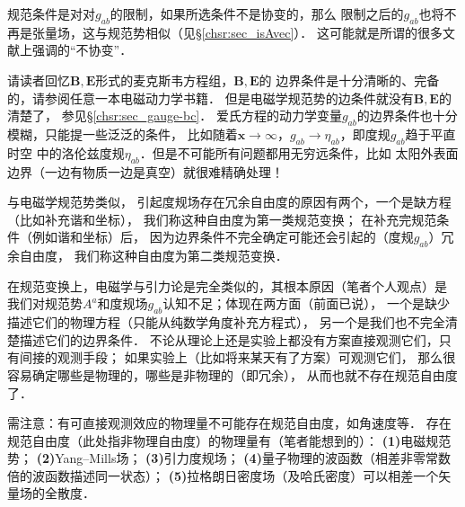 

规范条件是对对$g_{ab}$的限制，如果所选条件不是协变的，那么
限制之后的$g_{ab}$也将不再是张量场，这与规范势相似（见\S\ref{chsr:sec_isAvec}）．
这可能就是所谓的很多文献上强调的“不协变”．

请读者回忆$\boldsymbol{B},\boldsymbol{E}$形式的麦克斯韦方程组，$\boldsymbol{B},\boldsymbol{E}$的
边界条件是十分清晰的、完备的，请参阅任意一本电磁动力学书籍．
但是电磁学规范势的边条件就没有$\boldsymbol{B},\boldsymbol{E}$的清楚了，
参见\S\ref{chsr:sec_gauge-bc}．
爱氏方程的动力学变量$g_{ab}$的边界条件也十分模糊，只能提一些泛泛的条件，
比如随着$\boldsymbol{x}\to \infty$，$g_{ab}\to \eta_{ab}$，即度规$g_{ab}$趋于平直时空
中的洛伦兹度规$\eta_{ab}$．但是不可能所有问题都用无穷远条件，比如
太阳外表面边界（一边有物质一边是真空）就很难精确处理！

与电磁学规范势类似，
引起度规场存在冗余自由度的原因有两个，一个是缺方程（比如补充谐和坐标），
我们称这种自由度为{\heiti 第一类规范变换}；
在补充完规范条件（例如谐和坐标）后，
因为边界条件不完全确定可能还会引起的（度规$g_{ab}$）冗余自由度，
我们称这种自由度为{\heiti 第二类规范变换}．

在规范变换上，电磁学与引力论是完全类似的，其根本原因（笔者个人观点）是
我们对规范势$A^a$和度规场$g_{ab}$认知不足；体现在两方面（前面已说），
一个是缺少描述它们的物理方程（只能从纯数学角度补充方程式），
另一个是我们也不完全清楚描述它们的边界条件．
不论从理论上还是实验上都没有方案直接观测它们，只有间接的观测手段；
如果实验上（比如将来某天有了方案）可观测它们，
那么很容易确定哪些是物理的，哪些是非物理的（即冗余），
从而也就不存在规范自由度了．

需注意：有可直接观测效应的物理量不可能存在规范自由度，如角速度等．
存在规范自由度（此处指非物理自由度）的物理量有（笔者能想到的）：
{\bfseries (1)}电磁规范势；
{\bfseries (2)}Yang--Mills场；
{\bfseries (3)}引力度规场；
{\bfseries (4)}量子物理的波函数（相差非零常数倍的波函数描述同一状态）；
{\bfseries (5)}拉格朗日密度场（及哈氏密度）可以相差一个矢量场的全散度．







